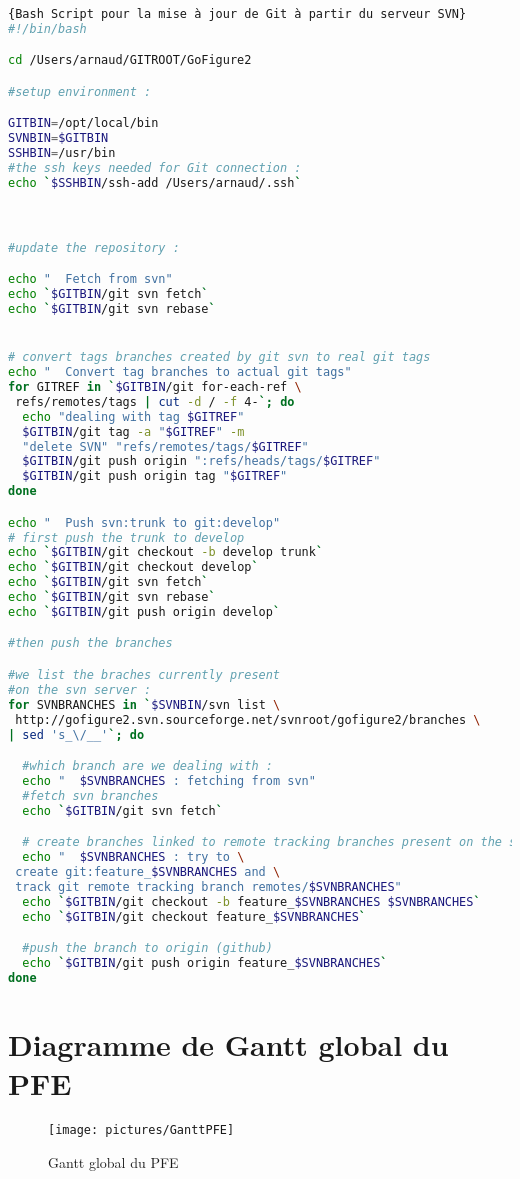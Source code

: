   \begin{lstlisting}[language=bash,title={Script de synchronisation SVN-Git\\exécuté sur le serveur "rainbowfish" localisé au Megason Lab }, label=GitSVNBash]{Bash Script pour la mise à jour de Git à partir du serveur SVN}
#!/bin/bash

cd /Users/arnaud/GITROOT/GoFigure2

#setup environment :

GITBIN=/opt/local/bin
SVNBIN=$GITBIN
SSHBIN=/usr/bin
#the ssh keys needed for Git connection :
echo `$SSHBIN/ssh-add /Users/arnaud/.ssh`



#update the repository :

echo "  Fetch from svn"
echo `$GITBIN/git svn fetch`
echo `$GITBIN/git svn rebase`


# convert tags branches created by git svn to real git tags
echo "  Convert tag branches to actual git tags"
for GITREF in `$GITBIN/git for-each-ref \
 refs/remotes/tags | cut -d / -f 4-`; do
  echo "dealing with tag $GITREF"
  $GITBIN/git tag -a "$GITREF" -m
  "delete SVN" "refs/remotes/tags/$GITREF"
  $GITBIN/git push origin ":refs/heads/tags/$GITREF"
  $GITBIN/git push origin tag "$GITREF"
done

echo "  Push svn:trunk to git:develop"
# first push the trunk to develop
echo `$GITBIN/git checkout -b develop trunk`
echo `$GITBIN/git checkout develop`
echo `$GITBIN/git svn fetch`
echo `$GITBIN/git svn rebase`
echo `$GITBIN/git push origin develop`

#then push the branches

#we list the braches currently present 
#on the svn server :
for SVNBRANCHES in `$SVNBIN/svn list \
 http://gofigure2.svn.sourceforge.net/svnroot/gofigure2/branches \
| sed 's_\/__'`; do

  #which branch are we dealing with :
  echo "  $SVNBRANCHES : fetching from svn"
  #fetch svn branches
  echo `$GITBIN/git svn fetch`

  # create branches linked to remote tracking branches present on the svn server
  echo "  $SVNBRANCHES : try to \
 create git:feature_$SVNBRANCHES and \
 track git remote tracking branch remotes/$SVNBRANCHES"
  echo `$GITBIN/git checkout -b feature_$SVNBRANCHES $SVNBRANCHES`
  echo `$GITBIN/git checkout feature_$SVNBRANCHES`

  #push the branch to origin (github)
  echo `$GITBIN/git push origin feature_$SVNBRANCHES`
done
  \end{lstlisting}





\chapter{Diagramme de Gantt global du PFE}
\label{AnnexeGanttGlobal}

\begin{figure}[H]
\begin{center}
\leavevmode
\texttt{[image: pictures/GanttPFE]}
\end{center}
\caption{Gantt global du PFE}
\label{fig:GanttPFEGlobal}
\end{figure}

